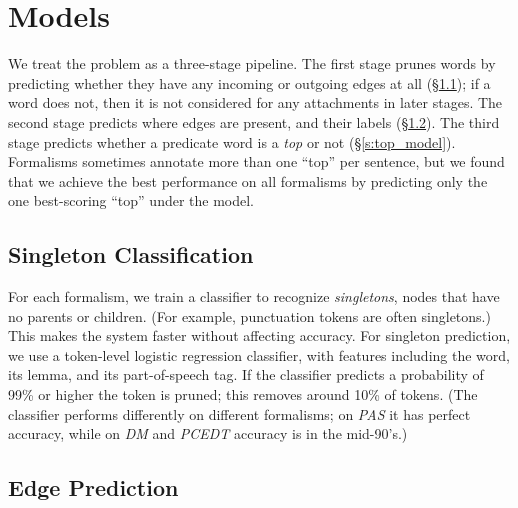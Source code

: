 \documentclass[11pt]{article}
\newcommand{\bocomment}[1]{\textcolor{Bittersweet}{[#1 -BTO]}}
\renewcommand{\bocomment}[1]{}
\begin{document}
\section{Models} \label{s:models}

We treat the problem as a three-stage pipeline.
The first stage prunes words by predicting whether they have any incoming or
outgoing edges at all (\S\ref{s:singleton_model}); 
if a word does not, then it is not 
considered for any attachments in later stages.
The second stage predicts where edges are
present, and their labels (\S\ref{s:edge_model}).
The third stage predicts whether a predicate word is a \emph{top} or not
(\S\ref{s:top_model}).
Formalisms sometimes annotate more than one ``top'' per sentence, but we
found that we achieve the best performance on all formalisms by predicting only
the one best-scoring ``top'' under the model.
\bocomment{Singleton pruning does not matter for LogitEdge.  It doesn't affect accuracy, I'm pretty sure.  But it is essential for the graph model.}



\subsection{Singleton Classification} \label{s:singleton_model}

For each formalism, we train a classifier to recognize \emph{singletons},
nodes that have no parents or children.
(For example, punctuation tokens are often singletons.)
This makes the system faster without affecting accuracy.
For singleton prediction, we use a token-level logistic regression
classifier, with features including
the word, its lemma, and its
part-of-speech tag.
If the classifier predicts a probability of 99\% or higher 
the token is pruned; this removes around 10\% of tokens.
(The classifier performs differently on different formalisms;
on \emph{PAS} it has perfect accuracy, 
while on
\emph{DM} and \emph{PCEDT} accuracy is in the mid-90's.)




\subsection{Edge Prediction} \label{s:edge_model}
\end{document}
